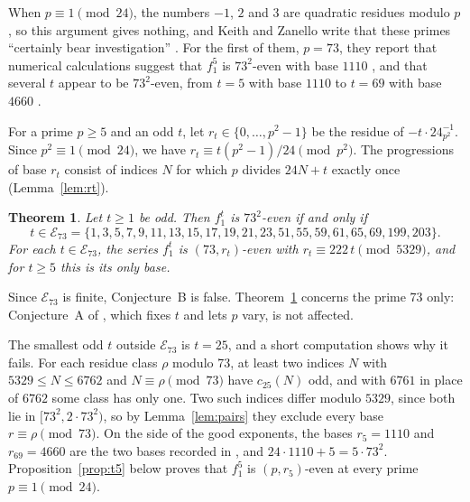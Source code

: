 \documentclass[12pt]{amsart}
\newtheorem{theorem}{Theorem}
\theoremstyle{definition}
\newcommand{\cE}{\mathcal{E}}
\newcommand{\lean}[1]{\ignorespaces}
\newcommand{\computed}[2]{\ignorespaces}
\newcommand{\mapitem}[1]{\ignorespaces}
\begin{document}
When $p\equiv1\pmod{24}$, the numbers $-1$, $2$ and $3$ are quadratic residues modulo $p$, so this argument gives nothing, and Keith and Zanello write that these primes ``certainly bear investigation'' \cite[Section~5]{KZ3}. For the first of them, $p=73$, they report that numerical calculations suggest that $f_1^5$ is $73^2$-even with base $1110$ \cite[Remark~35]{KZ3}, and that several $t$ appear to be $73^2$-even, from $t=5$ with base $1110$ to $t=69$ with base $4660$ \cite[Section~5]{KZ3}.

For a prime $p\ge5$ and an odd $t$, let $r_t\in\{0,\dots,p^2-1\}$ be the residue of $-t\cdot24_{p^2}^{-1}$. Since $p^2\equiv1\pmod{24}$, we have $r_t\equiv t(p^2-1)/24\pmod{p^2}$. The progressions of base $r_t$ consist of indices $N$ for which $p$ divides $24N+t$ exactly once (Lemma~\ref{lem:rt}).

\begin{theorem}\label{thm:73}
\lean{\decl{KeithZanello.theorem1}; the statement is \decl{KeithZanello.Theorem1}}
\computed{sh paper/check.sh 73}{code/impl1/out/tree_p73.txt}
\computed{sh code/impl2/rerun.sh sturm_p73 certificate_p73, the second implementation}{code/impl2/sturm_p73.out, code/impl2/certificate_p73.out}
Let $t\ge1$ be odd. Then $f_1^t$ is $73^2$-even if and only if
\[
t\in\cE_{73}=\{1,3,5,7,9,11,13,15,17,19,21,23,51,55,59,61,65,69,199,203\}.
\]
For each $t\in\cE_{73}$, the series $f_1^t$ is $(73,r_t)$-even with $r_t\equiv222\,t\pmod{5329}$, and for $t\ge5$ this is its only base.
\end{theorem}

Since $\cE_{73}$ is finite, Conjecture~B is false. Theorem~\ref{thm:73} concerns the prime 73 only: Conjecture~A of \cite{KZ3}, which fixes $t$ and lets $p$ vary, is not affected.

The smallest odd $t$ outside $\cE_{73}$ is $t=25$, and a short computation shows why it fails. For each residue class $\rho$ modulo 73, at least two indices $N$ with $5329\le N\le6762$ and $N\equiv\rho\pmod{73}$ have $c_{25}(N)$ odd, and with $6761$ in place of $6762$ some class has only one. Two such indices differ modulo $5329$, since both lie in $[73^2,2\cdot73^2)$, so by Lemma~\ref{lem:pairs} they exclude every base $r\equiv\rho\pmod{73}$.
\mapitem{Section~\ref{sec:intro}, the exponent $t=25$ at $p=73$}
\computed{gp -q paper/small_checks.gp, part 1}{paper/small_checks.out}
On the side of the good exponents, the bases $r_5=1110$ and $r_{69}=4660$ are the two bases recorded in \cite{KZ3}, and $24\cdot1110+5=5\cdot73^2$. Proposition~\ref{prop:t5} below proves that $f_1^5$ is $(p,r_5)$-even at every prime $p\equiv1\pmod{24}$.
\mapitem{Section~\ref{sec:intro}, the bases $r_5$ and $r_{69}$ at $p=73$}
\computed{gp -q paper/small_checks.gp, part 2}{paper/small_checks.out}
\end{document}
